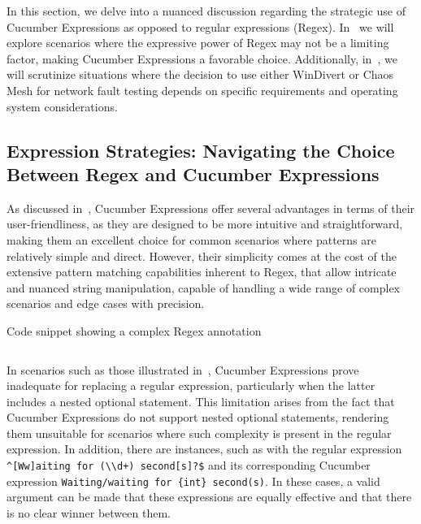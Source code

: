 In this section, we delve into a nuanced discussion regarding the strategic use of Cucumber Expressions as opposed to regular expressions (\ac{Regex}). In~ we will explore scenarios where the expressive power of \ac{Regex} may not be a limiting factor, making Cucumber Expressions a favorable choice. Additionally, in~, we will scrutinize situations where the decision to use either WinDivert or Chaos Mesh for network fault testing depends on specific requirements and operating system considerations.

\subsection{Expression Strategies: Navigating the Choice Between \ac{Regex} and Cucumber Expressions}
\label{subsec:expression-strategies}

As discussed in~, Cucumber Expressions offer several advantages in terms of their user-friendliness, as they are designed to be more intuitive and straightforward, making them an excellent choice for common scenarios where patterns are relatively simple and direct. However, their simplicity comes at the cost of the extensive pattern matching capabilities inherent to \ac{Regex}, that allow intricate and nuanced string manipulation, capable of handling a wide range of complex scenarios and edge cases with precision. 

\begin{listing}[!ht]
\caption{Code snippet showing a complex \ac{Regex} annotation}
\label{lst:complexRegex}
\inputminted[linenos, xleftmargin=2em]{java}{files/code/complexRegex.java}
\end{listing}

In scenarios such as those illustrated in~, Cucumber Expressions prove inadequate for replacing a regular expression, particularly when the latter includes a nested optional statement. This limitation arises from the fact that Cucumber Expressions do not support nested optional statements, rendering them unsuitable for scenarios where such complexity is present in the regular expression. In addition, there are instances, such as with the regular expression \verb|^[Ww]aiting for (\\d+) second[s]?$| and its corresponding Cucumber expression \verb|Waiting/waiting for {int} second(s)|. In these cases, a valid argument can be made that these expressions are equally effective and that there is no clear winner between them.

